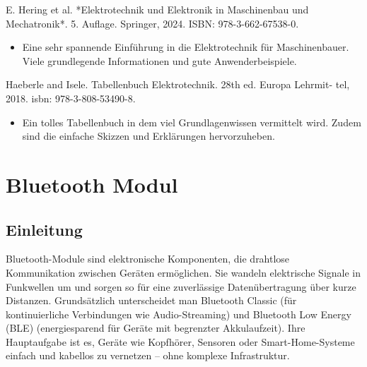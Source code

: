  E. Hering et al. *Elektrotechnik und Elektronik in Maschinenbau und Mechatronik*. 5. Auflage. Springer, 2024. ISBN: 978-3-662-67538-0.\cite{Hering:2024}
\begin{itemize}
	\item Eine sehr spannende Einführung in die Elektrotechnik für Maschinenbauer. Viele grundlegende Informationen und gute Anwenderbeispiele. 
\end{itemize}

Haeberle and Isele. Tabellenbuch Elektrotechnik. 28th ed. Europa Lehrmit-
tel, 2018. isbn: 978-3-808-53490-8.\cite{Haeberle:2018}
\begin{itemize}
	\item Ein tolles Tabellenbuch in dem viel Grundlagenwissen vermittelt wird. Zudem sind die einfache Skizzen und Erklärungen hervorzuheben.
\end{itemize}







\section{Bluetooth Modul}

\subsection{Einleitung}
	Bluetooth-Module sind elektronische Komponenten, die drahtlose Kommunikation zwischen Geräten ermöglichen. Sie wandeln elektrische Signale in Funkwellen um und sorgen so für eine zuverlässige Datenübertragung über kurze Distanzen. Grundsätzlich unterscheidet man Bluetooth Classic (für kontinuierliche Verbindungen wie Audio-Streaming) und Bluetooth Low Energy (BLE) (energiesparend für Geräte mit begrenzter Akkulaufzeit). Ihre Hauptaufgabe ist es, Geräte wie Kopfhörer, Sensoren oder Smart-Home-Systeme einfach und kabellos zu vernetzen – ohne komplexe Infrastruktur.
	
